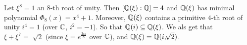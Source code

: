 \begin{example}\label{8.19}
  Let $\xi^8=1$ an  $8$-th root of unity. Then  $[\mathbb{Q}(\xi):\mathbb{Q}]=4$ and $\mathbb{Q}(\xi)$
  has minimal polynomial $\Phi_8(x)=x^4+1$. Moreover, $\mathbb{Q}(\xi)$ contains a
  primitive $4$-th root of unity $i^4=1$ (over $\mathbb{C}$,  $i^2=-1$). So that
  $\mathbb{Q}(i) \subseteq \mathbb{Q}(\xi)$. We als get that $\xi+\xi^7=\sqrt[]{2}$ (since
  $\xi=e^{\frac{2i\pi}{8}}$ over $\mathbb{C}$), and $\mathbb{Q}(\xi)=\mathbb{Q}(i,\sqrt[]{2})$.
\end{example}
